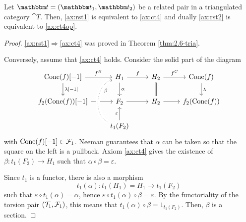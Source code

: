 \begin{lemma}\label{lemma_rst_equiv}
  Let $\t=(\t_1,\t_2)$ be a related pair in a triangulated category $\cat{T}$. Then, \ref{ax:rst1} is equivalent to \ref{ax:ct4} and dually \ref{ax:rst2} is equivalent to \ref{ax:ct4op}.
\end{lemma}
\begin{proof}
  \ref{ax:rst1}$\Rightarrow$\ref{ax:ct4} was proved in Theorem \ref{thm:2.6-tria}.

  Conversely, assume that
  \ref{ax:ct4} holds. Consider the solid part of the diagram
  \begin{equation*}
    \begin{tikzcd}
      \mathrm{Cone}(f)[-1]\arrow{r}{f^K}\arrow{d}{\lambda[-1]}
        & H_1\arrow{r}{f}\arrow{d}{\alpha}
          & H_2\arrow{r}{f^C}\arrow[equal]{d}
            & \mathrm{Cone}(f)\arrow{d}{\lambda}\\
       f_2(\mathrm{Cone}(f))[-1]\arrow{r}
        & F_2\arrow{r}
          & H_2\arrow{r}
            &  f_2(\mathrm{Cone}(f))\\
        &  t_1(F_2)\arrow{u}{\varepsilon}\arrow[dotted, crossing over, bend left=70]{uu}[near end,']{\beta}
        & &
    \end{tikzcd}
  \end{equation*}
  with $\mathrm{Cone}(f)[-1]\in\mathcal{F}_1$. Neeman \cite[Lemma~1.4.3]{Nee01} guarantees
  that $\alpha$ can be taken so that the square on the left is a pullback. Axiom \ref{ax:ct4}
  gives the existence of $\beta: t_1(F_2)\to H_1$ such that $\alpha\circ\beta=\varepsilon$.

  Since $ t_1$ is a functor, there is also a morphism
  \[ t_1(\alpha): t_1(H_1)=H_1\to  t_1(F_2)\] such that
  $\varepsilon\circ t_1(\alpha)=\alpha$, hence
  $\varepsilon\circ t_1(\alpha)\circ\beta = \varepsilon$. By the functoriality of
  the torsion pair $(\mathcal{T}_1,\mathcal{F}_1)$, this means that
  $ t_1(\alpha)\circ\beta=1_{ t_1(F_2)}$. Then, $\beta$ is a section.


\end{proof}

